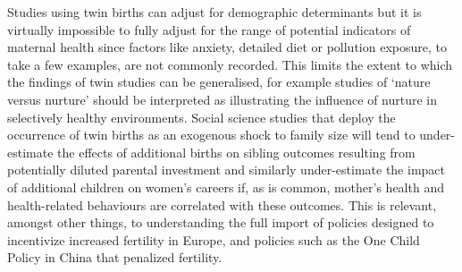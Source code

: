 \documentclass{nature}
\begin{document}
\begin{linenumbers}
Studies using twin births can adjust for demographic determinants but it is virtually impossible to fully adjust for the range of potential indicators of maternal health since factors like anxiety, detailed diet or pollution exposure, to take a few examples, are not commonly recorded. This limits the extent to which the findings of twin studies can be generalised, for example studies of `nature versus nurture' should be interpreted as illustrating the influence of nurture in selectively healthy environments. Social science studies that deploy the occurrence of twin births as an exogenous shock to family size will tend to under-estimate the effects of additional births on sibling outcomes resulting from potentially diluted parental investment and similarly under-estimate the impact of additional children on women's careers if, as is common, mother's health and health-related behaviours are correlated with these outcomes. This is relevant, amongst other things, to understanding the full import of policies designed to incentivize increased fertility in Europe, and policies such as the One Child Policy in China that penalized fertility.



\clearpage
\thispagestyle{empty}

\clearpage


\end{linenumbers}
\end{document}
